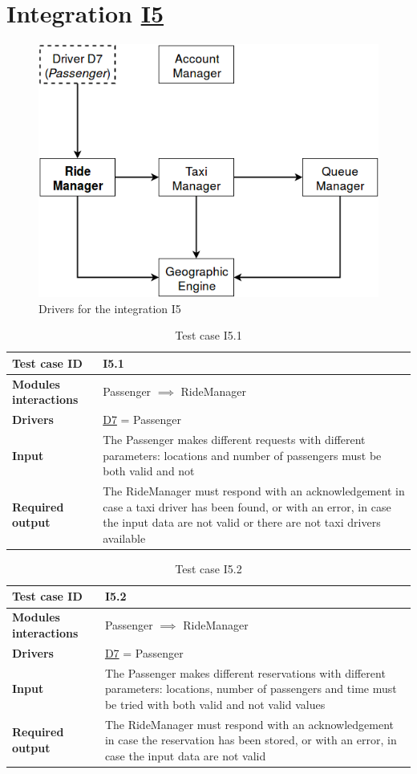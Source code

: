 \section{Integration \hyperref[I5]{I5} \label{int_I5}}
\begin{figure}[H]
\centering
\includegraphics[scale = 0.5]{"../Analysis Documents/I5"}
\caption{Drivers for the integration I5}
\end{figure}

\begin{table}[H]
\begin{tabular}{ l | p{} }
\textbf{Test case ID} & I5.1 \\ \hline
\textbf{Modules interactions} & Passenger $\implies$ RideManager \\ \hline
\textbf{Drivers} &  \hyperref[D7]{D7} = Passenger \\ \hline
\textbf{Input} & The Passenger makes different requests with different parameters: locations and number of passengers must be both valid and not\\ \hline
\textbf{Required output} & The RideManager must respond with an acknowledgement in case a taxi driver has been found, or with an error, in case the input data are not valid or there are not taxi drivers available
\end{tabular}
\caption{Test case I5.1}
\end{table}

\begin{table}[H]
\begin{tabular}{ l | p{} }
\textbf{Test case ID} & I5.2 \\ \hline
\textbf{Modules interactions} & Passenger $\implies$ RideManager \\ \hline
\textbf{Drivers} &  \hyperref[D7]{D7} = Passenger \\ \hline
\textbf{Input} & The Passenger makes different reservations with different parameters: locations, number of passengers and time must be tried with both valid and not valid values\\ \hline
\textbf{Required output} & The RideManager must respond with an acknowledgement in case the reservation has been stored, or with an error, in case the input data are not valid
\end{tabular}
\caption{Test case I5.2}
\end{table}